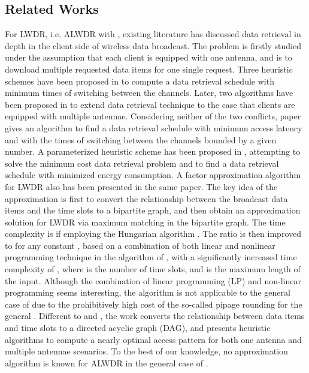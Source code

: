 \documentclass[11pt,english,onecolumn,draftcls]{IEEEtran}
\theoremstyle{plain}
\theoremstyle{plain}
\theoremstyle{plain}
\theoremstyle{plain}
\begin{document}
\subsection{Related Works}

For LWDR, i.e. ALWDR with , existing literature
has discussed data retrieval in depth in the client side of wireless
data broadcast. The problem is firstly studied under the assumption
that each client is equipped with one antenna, and is to download
multiple requested data items for one single request. Three heuristic
schemes have been proposed in \cite{hurson2006power} to compute a
data retrieval schedule with minimum times of switching between the
channels. Later, two algorithms have been proposed in \cite{Shi2010efficient}
to extend data retrieval technique to the case that clients are equipped
with multiple antennae. Considering neither of the two conflicts,
paper \cite{Gao2011} gives an algorithm to find a data retrieval
schedule with minimum access latency and with the times of switching
between the channels bounded by a given number. A parameterized heuristic
scheme has been proposed in \cite{Infocom12LuEfficient}, attempting
to solve the minimum cost data retrieval problem and to find a data
retrieval schedule with minimized energy consumption. A factor
approximation algorithm for LWDR also has been presented in the same
paper. The key idea of the approximation is first to convert the relationship
between the broadcast data items and the time slots to a bipartite
graph, and then obtain an approximation solution for LWDR via maximum
matching in the bipartite graph. The time complexity is 
if employing the Hungarian algorithm \cite{korte2002combinatorial}.
The ratio is then improved to  for any
constant , based on a combination of both linear and
nonlinear programming technique in the algorithm of \cite{lu2014data},
with a significantly increased time complexity of ,
where  is the number of time slots, and  is the maximum length
of the input. Although the combination of linear programming (LP)
and non-linear programming seems interesting, the algorithm is not
applicable to the general case of  due to the prohibitively
high cost of the so-called pipage rounding for the general 
\cite{lu2014data}. Different to \cite{Infocom12LuEfficient} and
\cite{lu2014data}, the work \cite{He2013Efficient} converts the
relationship between data items and time slots to a directed acyclic
graph (DAG), and presents heuristic algorithms to compute a nearly
optimal access pattern for both one antenna and multiple antennae
scenarios. To the best of our knowledge, no approximation algorithm
is known for ALWDR in the general case of .
\end{document}
